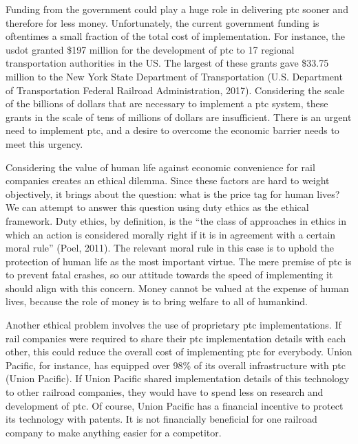 \documentclass[11pt, titlepage]{article}
\begin{document}
Funding from the government could play a huge role in delivering \gls{ptc} sooner
and therefore for less money. Unfortunately, the current government funding is
oftentimes a small fraction of the total cost of implementation. For instance, the
\gls{usdot} granted \$197 million for the development of \gls{ptc} to 17 regional
transportation authorities in the US. The largest of these grants gave \$33.75
million to the New York State Department of Transportation (U.S. Department of
Transportation Federal Railroad Administration, 2017). Considering the scale of the
billions of dollars that are necessary to implement a \gls{ptc} system, these grants
in the scale of tens of millions of dollars are insufficient. There is an urgent
need to implement \gls{ptc}, and a desire to overcome the economic barrier needs to
meet this urgency.

Considering the value of human life against economic convenience for rail companies
creates an ethical dilemma. Since these factors are hard to weight objectively, it
brings about the question: what is the price tag for human lives? We can attempt to
answer this question using duty ethics as the ethical framework. Duty ethics, by
definition, is the ``the class of approaches in ethics in which an action is
considered morally right if it is in agreement with a certain moral rule'' (Poel,
2011). The relevant moral rule in this case is to uphold the protection of human
life as the most important virtue. The mere premise of \gls{ptc} is to prevent fatal
crashes, so our attitude towards the speed of implementing it should align with this
concern. Money cannot be valued at the expense of human lives, because the role of
money is to bring welfare to all of humankind.

Another ethical problem involves the use of proprietary \gls{ptc} implementations.
If rail companies were required to share their \gls{ptc} implementation details with
each other, this could reduce the overall cost of implementing \gls{ptc} for
everybody. Union Pacific, for instance, has equipped over 98\% of its overall
infrastructure with \gls{ptc} (Union Pacific). If Union Pacific shared
implementation details of this technology to other railroad companies, they would
have to spend less on research and development of \gls{ptc}.  Of course, Union
Pacific has a financial incentive to protect its technology with patents. It is not
financially beneficial for one railroad company to make anything easier for a
competitor.
\end{document}
